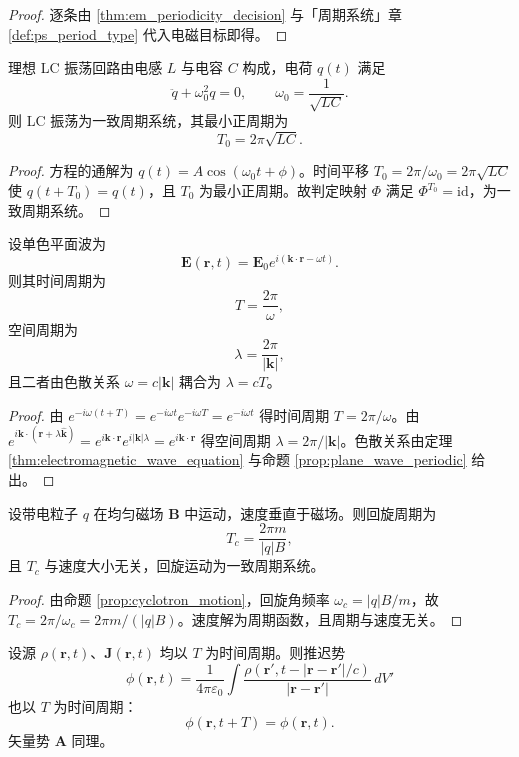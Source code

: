 \begin{proof}
逐条由 \cref{thm:em_periodicity_decision} 与「周期系统」章 \cref{def:ps_period_type} 代入电磁目标即得。
\end{proof}

\begin{lemma}[LC 振荡的周期判定]\label{lem:lc_periodic}
理想 LC 振荡回路由电感 $L$ 与电容 $C$ 构成，电荷 $q(t)$ 满足
\[
\ddot q+\omega_0^2q=0,\qquad \omega_0=\frac{1}{\sqrt{LC}}.
\]
则 LC 振荡为一致周期系统，其最小正周期为
\[
T_0=2\pi\sqrt{LC}.
\]
\end{lemma}

\begin{proof}
方程的通解为 $q(t)=A\cos(\omega_0t+\phi)$。时间平移 $T_0=2\pi/\omega_0=2\pi\sqrt{LC}$ 使 $q(t+T_0)=q(t)$，且 $T_0$ 为最小正周期。故判定映射 $\Phi$ 满足 $\Phi^{T_0}=\mathrm{id}$，为一致周期系统。
\end{proof}

\begin{lemma}[单色平面波的周期判定]\label{lem:plane_wave_periodic_decision}
设单色平面波为
\[
\mathbf E(\mathbf r,t)=\mathbf E_0e^{i(\mathbf k\cdot\mathbf r-\omega t)}.
\]
则其时间周期为
\[
T=\frac{2\pi}{\omega},
\]
空间周期为
\[
\lambda=\frac{2\pi}{|\mathbf k|},
\]
且二者由色散关系 $\omega=c|\mathbf k|$ 耦合为 $\lambda=cT$。
\end{lemma}

\begin{proof}
由 $e^{-i\omega(t+T)}=e^{-i\omega t}e^{-i\omega T}=e^{-i\omega t}$ 得时间周期 $T=2\pi/\omega$。由 $e^{i\mathbf k\cdot(\mathbf r+\lambda\hat{\mathbf k})}=e^{i\mathbf k\cdot\mathbf r}e^{i|\mathbf k|\lambda}=e^{i\mathbf k\cdot\mathbf r}$ 得空间周期 $\lambda=2\pi/|\mathbf k|$。色散关系由定理 \ref{thm:electromagnetic_wave_equation} 与命题 \ref{prop:plane_wave_periodic} 给出。
\end{proof}

\begin{lemma}[回旋运动的周期判定]\label{lem:cyclotron_periodic}
设带电粒子 $q$ 在均匀磁场 $\mathbf B$ 中运动，速度垂直于磁场。则回旋周期为
\[
T_c=\frac{2\pi m}{|q|B},
\]
且 $T_c$ 与速度大小无关，回旋运动为一致周期系统。
\end{lemma}

\begin{proof}
由命题 \ref{prop:cyclotron_motion}，回旋角频率 $\omega_c=|q|B/m$，故 $T_c=2\pi/\omega_c=2\pi m/(|q|B)$。速度解为周期函数，且周期与速度无关。
\end{proof}

\begin{lemma}[推迟势保持源的周期]\label{lem:retarded_period_preserved}
设源 $\rho(\mathbf r,t)$、$\mathbf J(\mathbf r,t)$ 均以 $T$ 为时间周期。则推迟势
\[
\phi(\mathbf r,t)=\frac{1}{4\pi\varepsilon_0}\int\frac{\rho(\mathbf r',t-|\mathbf r-\mathbf r'|/c)}{|\mathbf r-\mathbf r'|}\,dV'
\]
也以 $T$ 为时间周期：
\[
\phi(\mathbf r,t+T)=\phi(\mathbf r,t).
\]
矢量势 $\mathbf A$ 同理。
\end{lemma}

